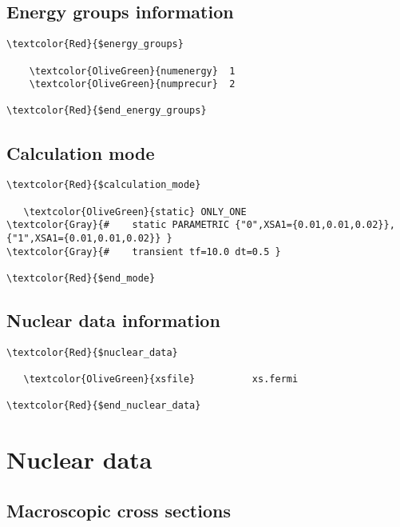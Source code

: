 \subsection{Energy groups information}

\begin{Verbatim}[frame=single,commandchars=\\\{\}]
\textcolor{Red}{$energy_groups}

    \textcolor{OliveGreen}{numenergy}  1
    \textcolor{OliveGreen}{numprecur}  2
    
\textcolor{Red}{$end_energy_groups}
\end{Verbatim}

\subsection{Calculation mode}

\begin{Verbatim}[frame=single,commandchars=\\\{\}]
\textcolor{Red}{$calculation_mode}

   \textcolor{OliveGreen}{static} ONLY_ONE 
\textcolor{Gray}{#    static PARAMETRIC {"0",XSA1={0.01,0.01,0.02}}, {"1",XSA1={0.01,0.01,0.02}} }
\textcolor{Gray}{#    transient tf=10.0 dt=0.5 }

\textcolor{Red}{$end_mode}
\end{Verbatim}

\subsection{Nuclear data information}

\begin{Verbatim}[frame=single,commandchars=\\\{\}]
\textcolor{Red}{$nuclear_data}

   \textcolor{OliveGreen}{xsfile}          xs.fermi
   
\textcolor{Red}{$end_nuclear_data}
\end{Verbatim}


\section{Nuclear data}

\subsection{Macroscopic cross sections}


